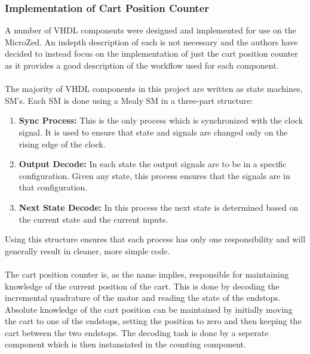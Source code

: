 \subsubsection{Implementation of Cart Position Counter} %
\label{ssub:vhdl_components}
A number of VHDL components were designed and implemented for use on the MicroZed.
An indepth description of each is not necessary and the authors have decided to instead focus on the implementation of just the cart position counter as it provides a good description of the workflow used for each component.
\\~\\
The majority of VHDL components in this project are written as state machines, SM's.
Each SM is done using a Mealy SM in a three-part structure:
\begin{enumerate}
	\item \textbf{Sync Process:} This is the only process which is synchronized with the clock signal.
	It is used to ensure that state and signals are changed only on the rising edge of the clock.
	\item \textbf{Output Decode:} In each state the output signals are to be in a specific configuration.
	Given any state, this process ensures that the signals are in that configuration.
	\item \textbf{Next State Decode:} In this process the next state is determined based on the current state and the current inputs.
\end{enumerate}
Using this structure ensures that each process has only one responsibility and will generally result in cleaner, more simple code.
\\~\\
The cart position counter is, as the name implies, responsible for maintaining knowledge of the current position of the cart.
This is done by decoding the incremental quadrature of the motor and reading the state of the endstops.
Absolute knowledge of the cart position can be maintained by initially moving the cart to one of the endstops, setting the position to zero and then keeping the cart between the two endstops.
The decoding task is done by a seperate component which is then instansiated in the counting component.

